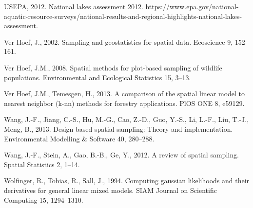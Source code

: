 \documentclass[]{elsarticle} %
\begin{document}
\leavevmode\hypertarget{ref-USEPA2012NLA}{}%
USEPA, 2012. National lakes assessment 2012.
https://www.epa.gov/national-aquatic-resource-surveys/national-results-and-regional-highlights-national-lakes-assessment.

\leavevmode\hypertarget{ref-verhoef2002sampling}{}%
Ver Hoef, J., 2002. Sampling and geostatistics for spatial data.
Ecoscience 9, 152--161.

\leavevmode\hypertarget{ref-verhoef2008spatial}{}%
Ver Hoef, J.M., 2008. Spatial methods for plot-based sampling of
wildlife populations. Environmental and Ecological Statistics 15, 3--13.

\leavevmode\hypertarget{ref-ver2013comparison}{}%
Ver Hoef, J.M., Temesgen, H., 2013. A comparison of the spatial linear
model to nearest neighbor (k-nn) methods for forestry applications. PlOS
ONE 8, e59129.

\leavevmode\hypertarget{ref-wang2013design}{}%
Wang, J.-F., Jiang, C.-S., Hu, M.-G., Cao, Z.-D., Guo, Y.-S., Li, L.-F.,
Liu, T.-J., Meng, B., 2013. Design-based spatial sampling: Theory and
implementation. Environmental Modelling \& Software 40, 280--288.

\leavevmode\hypertarget{ref-wang2012review}{}%
Wang, J.-F., Stein, A., Gao, B.-B., Ge, Y., 2012. A review of spatial
sampling. Spatial Statistics 2, 1--14.

\leavevmode\hypertarget{ref-wolfinger1994computing}{}%
Wolfinger, R., Tobias, R., Sall, J., 1994. Computing gaussian
likelihoods and their derivatives for general linear mixed models. SIAM
Journal on Scientific Computing 15, 1294--1310.
\end{document}
